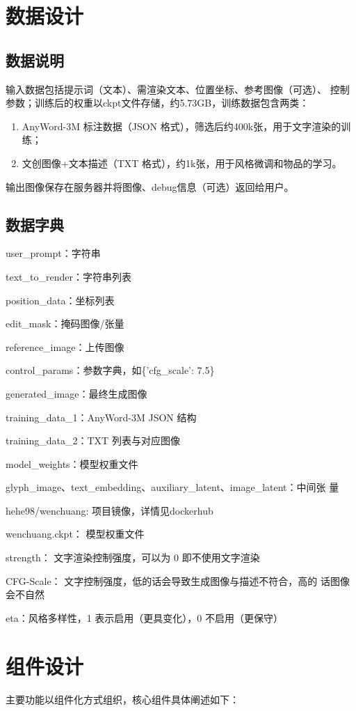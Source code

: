 \documentclass[a4paper,12pt]{article}
\begin{document}
\section{数据设计}
\subsection{数据说明}
输入数据包括提示词（文本）、需渲染文本、位置坐标、参考图像（可选）、
控制参数；训练后的权重以ckpt文件存储，约5.73GB，训练数据包含两类：
\begin{enumerate}
    \item AnyWord-3M 标注数据（JSON 格式），筛选后约400k张，用于文字渲染的训练；

    \item 文创图像+文本描述（TXT 格式），约1k张，用于风格微调和物品的学习。
\end{enumerate}

输出图像保存在服务器并将图像、debug信息（可选）返回给用户。
\subsection{数据字典}
user\_prompt：字符串

text\_to\_render：字符串列表

position\_data：坐标列表

edit\_mask：掩码图像/张量

reference\_image：上传图像

control\_params：参数字典，如\{'cfg\_scale': 7.5\}

generated\_image：最终生成图像

training\_data\_1：AnyWord-3M JSON 结构

training\_data\_2：TXT 列表与对应图像

model\_weights：模型权重文件

glyph\_image、text\_embedding、auxiliary\_latent、image\_latent：中间张
量

hehe98/wenchuang: 项目镜像，详情见dockerhub

wenchuang.ckpt： 模型权重文件

strength： 文字渲染控制强度，可以为 0 即不使用文字渲染

CFG-Scale： 文字控制强度，低的话会导致生成图像与描述不符合，高的
话图像会不自然

eta：风格多样性，1 表示启用（更具变化），0 不启用（更保守）

\section{组件设计}
主要功能以组件化方式组织，核心组件具体阐述如下：
\end{document}
